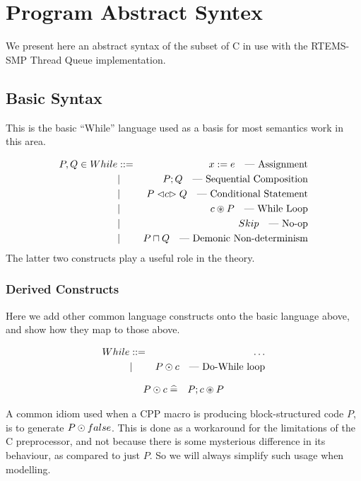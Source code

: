 \section{Program Abstract Syntex}

We present here an abstract syntax of the subset of C in use
with the RTEMS-SMP Thread Queue implementation.


\subsection{Basic Syntax}

This is the basic ``While'' language used as a basis for most semantics
work in this area.

\begin{eqnarray*}
   P,Q \in While
   &::=&  x := e       \quad\mbox{--- Assignment}
\\ & | &  P ; Q        \quad\mbox{--- Sequential Composition}
\\ & | &  P \mathrel{\lhd {c} \rhd} Q  \quad\mbox{--- Conditional Statement}
\\ & | &  c \circledast P     \quad\mbox{--- While Loop}
\\ & | &  Skip         \quad\mbox{--- No-op}
\\ & | &  P \sqcap Q     \quad\mbox{--- Demonic Non-determinism}
\end{eqnarray*}
The latter two constructs play a useful role in the theory.

\subsubsection{Derived Constructs}

Here we add other common language constructs onto the basic language above,
and show how they map to those above.

\begin{eqnarray*}
   While &::=& \dots
\\ & | & P \odot c   \quad\mbox{--- Do-While loop}
\end{eqnarray*}


\begin{eqnarray*}
    P \odot c &\mathrel{\widehat=}&  P ; c \circledast P
\end{eqnarray*}

A common idiom used
when a CPP macro is producing  block-structured code $P$,
is to generate $P \odot false$.
This is done as a workaround for the limitations of the C preprocessor,
and not because there is some mysterious difference in its behaviour,
as compared to just $P$.
So we will always simplify such usage when modelling.

